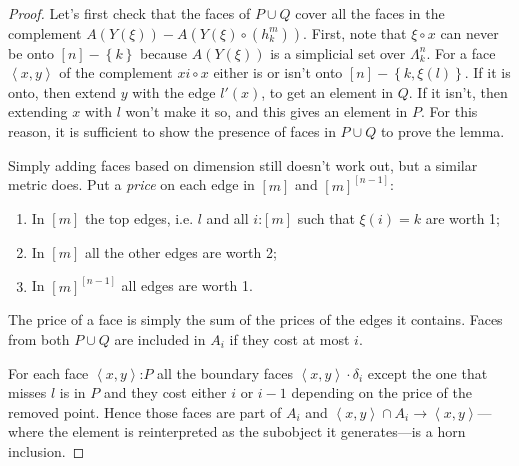 \documentclass{tac}
\newcommand\of{\mathord:}
\newcommand\set[1]{\left\{#1\right\}}
\newcommand\tuplet[1]{\left\langle{} #1 \right\rangle}
\begin{document}
\begin{proof}
  
  Let's first check that the faces of \(P\cup Q\) cover all the faces in 
  the complement \( A(Y(\xi)) - A(Y(\xi)\circ(h^m_k)) \). 
  First, note that \(\xi\circ x\) can never be onto \([n]-\set{k}\) because 
  \(A(Y(\xi))\) is a simplicial set over \(\Lambda^n_k\).
  For a face \(\tuplet{x,y}\) of the complement \(xi\circ x\) either is or isn't 
  onto \([n]-\set{k,\xi(l)}\). %
  If it is onto, then extend \(y\) with the edge \(l'(x)\), to get an 
  element in \(Q\).
  If it isn't, then extending \(x\) with \(l\) won't make it so, and this gives 
  an element in \(P\). For this reason, it is sufficient to show the presence of 
  faces in \(P\cup Q\) to prove the lemma.

  Simply adding faces based on dimension still doesn't work out, but a similar
  metric does. Put a \emph{price} on each edge in \([m]\) and \({[m]}^{[n-1]}\):
  \begin{enumerate}
    \item In \([m]\) the top edges, i.e. \(l\) and all \(i\of [m]\) such 
    that \(\xi(i) = k\) are worth 1;
    \item In \([m]\) all the other edges are worth 2;
    \item In \({[m]}^{[n-1]}\) all edges are worth 1.
  \end{enumerate}
  The price of a face is simply the sum of the prices of the edges it contains. 
  Faces from both \(P\cup Q\) are included in \(A_i\) if they cost at 
  most \(i\).

  For each face \(\tuplet{x,y}\of P\) %
  all the boundary faces \(\tuplet{x,y}\cdot\delta_i\) except the 
  one that misses \(l\) is in \(P\) and they cost either \(i\) or \(i-1\)
  depending on the price of the removed point. Hence those faces are part of
  \(A_i\) and \(\tuplet{x,y}\cap A_i \to \tuplet{x,y}\)---where the element is
  reinterpreted as the subobject it generates---is a horn inclusion.
  

\end{proof}
\end{document}
